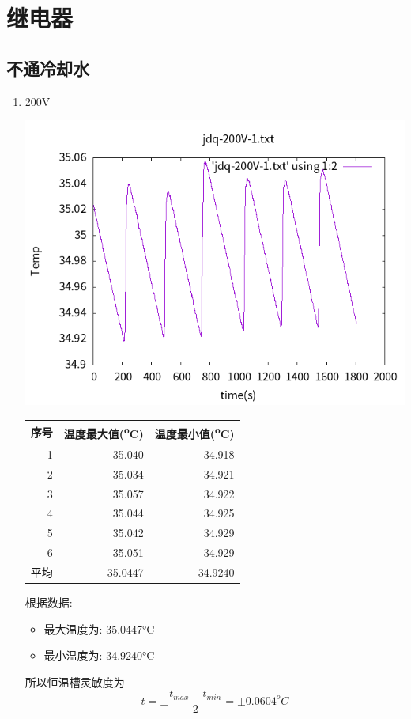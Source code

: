 \documentclass[11pt]{report}
\begin{document}
\chapter{继电器}
\label{sec:orgef788d7}
\section{不通冷却水}
\label{sec:org2348d97}
\begin{enumerate}
\item 200V
\label{sec:org335b3f0}
\begin{center}
\includegraphics[width=.9\linewidth]{../img/jdq-200V-1.txt.png}
\end{center}
\begin{center}
\begin{tabular}{rrr}
序号 & 温度最大值(\textsuperscript{o}C) & 温度最小值(\textsuperscript{o}C)\\
\hline
1 & 35.040 & 34.918\\
2 & 35.034 & 34.921\\
3 & 35.057 & 34.922\\
4 & 35.044 & 34.925\\
5 & 35.042 & 34.929\\
6 & 35.051 & 34.929\\
平均 & 35.0447 & 34.9240\\
\end{tabular}
\end{center}

根据数据:
\begin{itemize}
\item 最大温度为: 35.0447°C
\item 最小温度为: 34.9240°C
\end{itemize}
所以恒温槽灵敏度为
\[
t=\pm\frac{t_{max}-t_{min}}{2}=\pm 0.0604^{o}C
\]



\end{enumerate}
\end{document}
